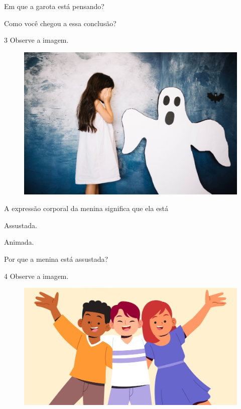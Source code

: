 \begin{escolha}
\item Em que a garota está pensando?\\

\item Como você chegou a essa conclusão?\\
\end{escolha}

\num{3} Observe a imagem.
\enlargethispage{2\baselineskip}

\begin{figure}[H]
\centering
\includegraphics[width=.6\textwidth]{media/image204.jpg}
\end{figure}

\begin{escolha}
\item A expressão corporal da menina significa que ela está

\begin{multicols}{2}
\begin{boxlist}
 Assustada.

 Animada.
\end{boxlist}
\end{multicols}

\item Por que a menina está assustada?\\

\end{escolha}

\num{4} Observe a imagem.

\begin{figure}[H]
\centering
\includegraphics[width=.7\textwidth]{media/image203.png}
\end{figure}

